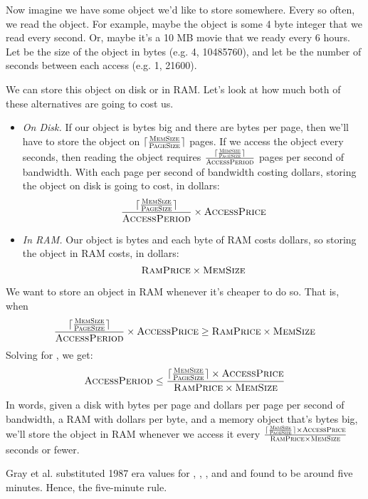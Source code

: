 \documentclass[12pt]{article}
\DeclarePairedDelimiter{\ceil}{\lceil}{\rceil}
\newcommand{\emf}[1]{\textcolor{berkgoldalt}{#1}}
\begin{document}
Now imagine we have some object we'd like to store somewhere. Every so often,
we read the object. For example, maybe the object is some 4 byte integer that
we read every second. Or, maybe it's a 10 MB movie that we ready every 6 hours.
Let \emf{\memsize{}} be the size of the object in bytes (e.g. 4, 10485760), and
let \emf{\accessperiod{}} be the number of seconds between each access (e.g. 1,
21600).

We can store this object on disk or in RAM. Let's look at how much both of
these alternatives are going to cost us.

\newcommand{\numpages}{\ceil{\frac{\memsize}{\pagesize}}}
\begin{itemize}
  \item \emph{On Disk.}
    If our object is \memsize{} bytes big and there are \pagesize{} bytes per
    page, then we'll have to store the object on $\numpages$ pages. If we
    access the object every \accessperiod{} seconds, then reading the object
    requires $\frac{\numpages}{\accessperiod}$ pages per second of bandwidth.
    With each page per second of bandwidth costing \accessprice{} dollars,
    storing the object on disk is going to cost, in dollars:
    \[
      \frac{\numpages}{\accessperiod} \times \accessprice
    \]
  \item \emph{In RAM.}
    Our object is \memsize{} bytes and each byte of RAM costs \ramprice{}
    dollars, so storing the object in RAM costs, in dollars:
    \[
      \textsc{RamPrice} \times \textsc{MemSize}
    \]
\end{itemize}

We want to store an object in RAM whenever it's cheaper to do so. That is, when
\[
  \frac{\numpages}{\accessperiod} \times \accessprice
  \geq
  \ramprice \times \memsize
\]
Solving for \accessperiod{}, we get:
\[
  \accessperiod
  \leq
  \frac{\numpages \times \accessprice}{\ramprice \times \memsize}
\]
In words, given a disk with \pagesize{} bytes per page and \accessprice{}
dollars per page per second of bandwidth, a RAM with \ramprice{} dollars per
byte, and a memory object that's \memsize{} bytes big, we'll store the object
in RAM whenever we access it every
$\frac{\numpages \times \accessprice}{\ramprice \times \memsize}$
seconds or fewer.

Gray et al. substituted 1987 era values for \pagesize{}, \accessprice{},
\ramprice{}, and \memsize{} and found \accessperiod{} to be around five
minutes. Hence, the five-minute rule.
\end{document}
